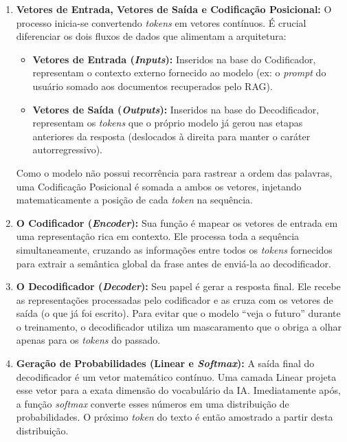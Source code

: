 \begin{enumerate}
  \item \textbf{Vetores de Entrada, Vetores de Saída e Codificação Posicional:} O processo inicia-se convertendo \textit{tokens} em vetores contínuos. É crucial diferenciar os dois fluxos de dados que alimentam a arquitetura:
    \begin{itemize}
      \item \textbf{Vetores de Entrada (\textit{Inputs}):} Inseridos na base do Codificador, representam o contexto externo fornecido ao modelo (ex: o \textit{prompt} do usuário somado aos documentos recuperados pelo RAG).
      \item \textbf{Vetores de Saída (\textit{Outputs}):} Inseridos na base do Decodificador, representam os \textit{tokens} que o próprio modelo já gerou nas etapas anteriores da resposta (deslocados à direita para manter o caráter autorregressivo).
    \end{itemize}
    Como o modelo não possui recorrência para rastrear a ordem das palavras, uma Codificação Posicional é somada a ambos os vetores, injetando matematicamente a posição de cada \textit{token} na sequência.

  \item \textbf{O Codificador (\textit{Encoder}):} Sua função é mapear os vetores de entrada em uma representação rica em contexto. Ele processa toda a sequência simultaneamente, cruzando as informações entre todos os \textit{tokens} fornecidos para extrair a semântica global da frase antes de enviá-la ao decodificador.

  \item \textbf{O Decodificador (\textit{Decoder}):} Seu papel é gerar a resposta final. Ele recebe as representações processadas pelo codificador e as cruza com os vetores de saída (o que já foi escrito). Para evitar que o modelo ``veja o futuro'' durante o treinamento, o decodificador utiliza um mascaramento que o obriga a olhar apenas para os \textit{tokens} do passado.

  \item \textbf{Geração de Probabilidades (Linear e \textit{Softmax}):} A saída final do decodificador é um vetor matemático contínuo. Uma camada Linear projeta esse vetor para a exata dimensão do vocabulário da IA. Imediatamente após, a função \textit{softmax} converte esses números em uma distribuição de probabilidades. O próximo \textit{token} do texto é então amostrado a partir desta distribuição.
\end{enumerate}

